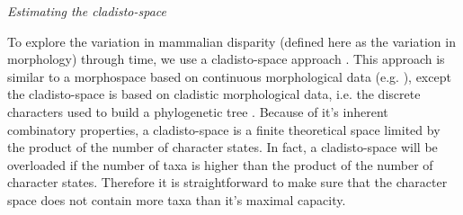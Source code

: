\documentclass[12pt,letterpaper]{article}
\renewcommand{\subsection}[1]{%
\bigskip
\begin{center}
\begin{large}
\normalfont\itshape #1
\end{large}
\end{center}}
\begin{document}
\subsection{Estimating the cladisto-space} %
To explore the variation in mammalian disparity (defined here as the variation in morphology) through time, we use a cladisto-space approach \cite{Foote01071994,Foote29111996,Wesley-Hunt2005,Brusatte12092008,friedmanexplosive2010,toljagictriassic-jurassic2013}. This approach is similar to a morphospace based on continuous morphological data (e.g. \cite{finlay2015morphological}), except the cladisto-space is based on cladistic morphological data, i.e. the discrete characters used to build a phylogenetic tree \cite{Foote01071994,Foote29111996,Wesley-Hunt2005,Brusatte12092008,friedmanexplosive2010,toljagictriassic-jurassic2013}.
Because of it's inherent combinatory properties, a cladisto-space is a finite theoretical space limited by the product of the number of character states. In fact, a cladisto-space will be overloaded if the number of taxa is higher than the product of the number of character states. Therefore it is straightforward to make sure that the character space does not contain more taxa than it's maximal capacity.
\end{document}
